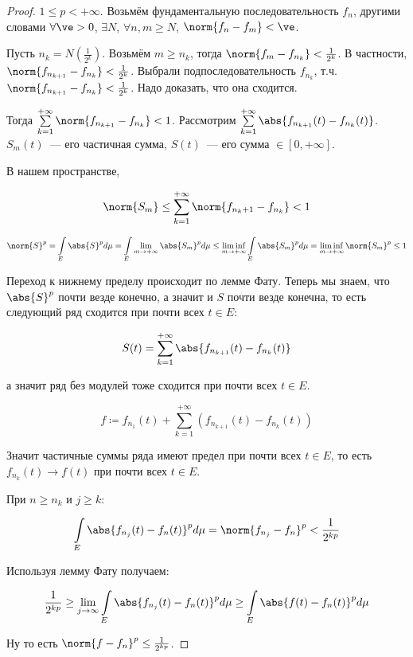 \begin{proof}
    $1 \le p < +\infty$. Возьмём фундаментальную последовательность $f_n$,
    другими словами $\forall \ve > 0$, $\exists N$, $\forall n, m \ge N$,
    $\norm{f_n - f_m} < \ve$.

    Пусть $n_k = N(\frac1{2^k})$. Возьмём $m \ge n_k$,
    тогда $\norm{f_m - f_{n_k}} < \frac1{2^k}$.
    В частности, $\norm{f_{n_{k+1}} - f_{n_k}} < \frac{1}{2^k}$.
    Выбрали подпоследовательность $f_{n_k}$, т.ч. $\norm{f_{n_{k+1}} - f_{n_k}}
        < \frac{1}{2^k}$. Надо доказать, что она сходится.

    Тогда $\sum\limits_{k=1}^{+\infty} \norm{f_{n_{k+1}} - f_{n_k}} < 1$.
    Рассмотрим $\sum\limits_{k=1}^{+\infty} \abs{f_{n_{k+1}}(t) - f_{n_k}(t)}$.
    $S_m(t)$~--- его частичная сумма, $S(t)$~--- его сумма $\in [0, +\infty]$.

    В нашем пространстве,

    \[
        \norm{S_m} \le \sum\limits_{k=1}^{+\infty}
        \norm{f_{n_k+1} - f_{n_k}} < 1
    \]

    \[
        \norm{S}^p = \int\limits_E \abs{S}^p d\mu
        = \int\limits_E \lim\limits_{m\to +\infty} \abs{S_m}^p d\mu
        \le \liminf_{m\to +\infty} \int\limits_E \abs{S_m}^p d\mu
        = \liminf_{m\to +\infty} \norm{S_m}^p
        \le 1
    \]

    Переход к нижнему пределу происходит по лемме Фату.
    Теперь мы знаем, что $\abs{S}^p$ почти везде конечно, а значит
    и $S$ почти везде конечна, то есть следующий ряд сходится при
    почти всех $t \in E$:

    \[
        S(t) = \sum\limits_{k=1}^{+\infty} \abs{f_{n_{k+1}}(t) - f_{n_k}(t)}
    \]

    а значит ряд без модулей тоже сходится при почти всех $t \in E$.

    \[
        f \coloneqq
        f_{n_1}(t) + \sum\limits_{k=1}^{+\infty} \left( f_{n_{k+1}}(t) - f_{n_k}(t) \right)
    \]

    Значит частичные суммы ряда имеют предел при почти всех $t \in E$,
    то есть $f_{n_k}(t) \to f(t)$ при почти всех $t \in E$.

    При $n \ge n_k$ и $j \ge k$:

    \[
        \int\limits_E \abs{f_{n_j}(t) - f_n(t)}^p d\mu = \norm{f_{n_j} - f_n}^p <
        \frac1{2^{kp}}
    \]

    Используя лемму Фату получаем:

    \[
        \frac{1}{2^{kp}} \ge \lim\limits_{j\to\infty} \int\limits_E \abs{f_{n_j}(t) - f_n(t)}^p d\mu \ge
        \int\limits_E \abs{f(t) - f_n(t)}^p d\mu
    \]

    Ну то есть $\norm{f - f_n}^p \le \frac{1}{2^{kp}}$.
\end{proof}

